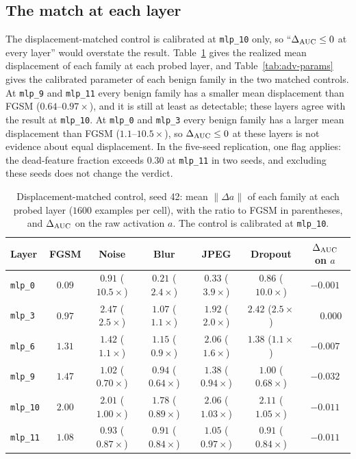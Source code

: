 \documentclass[../ppgc-tese.tex]{subfiles}
\begin{document}
\subsection{The match at each layer}
\label{sec:adv-dx-layers}
The displacement-matched control is calibrated at \texttt{mlp\_10} only, so
``$\Delta_{\mathrm{AUC}}\le0$ at every layer'' would overstate the result.
Table~\ref{tab:adv-dx-layers} gives the realized mean displacement of each
family at each probed layer, and Table~\ref{tab:adv-params} gives the
calibrated parameter of each benign family in the two matched controls. At
\texttt{mlp\_9} and \texttt{mlp\_11} every benign family has a smaller mean
displacement than FGSM ($0.64$--$0.97\times$), and it is still at least as
detectable; these layers agree with the result at \texttt{mlp\_10}. At
\texttt{mlp\_0} and \texttt{mlp\_3} every benign family has a larger mean
displacement than FGSM ($1.1$--$10.5\times$), so $\Delta_{\mathrm{AUC}}\le0$ at these layers
is not evidence about equal displacement. In the five-seed replication, one
flag applies: the dead-feature fraction exceeds $0.30$ at \texttt{mlp\_11} in
two seeds, and excluding these seeds does not change the verdict.

\begin{table}[ht]
  \centering
  \caption{Displacement-matched control, seed 42: mean $\lVert\Delta a\rVert$
  of each family at each probed layer ($1600$ examples per cell), with the
  ratio to FGSM in parentheses, and $\Delta_{\mathrm{AUC}}$ on the raw activation $a$. The
  control is calibrated at \texttt{mlp\_10}.}
  \label{tab:adv-dx-layers}
  \footnotesize
  \setlength{\tabcolsep}{3pt}
  \begin{tabular}{@{}lcccccc@{}}
    \toprule
    Layer & FGSM & Noise & Blur & JPEG & Dropout & $\Delta_{\mathrm{AUC}}$ on $a$ \\
    \midrule
    \texttt{mlp\_0} & $0.09$ & $0.91$ ($10.5\times$) & $0.21$ ($2.4\times$) & $0.33$ ($3.9\times$) & $0.86$ ($10.0\times$) & $-0.001$ \\
    \texttt{mlp\_3} & $0.97$ & $2.47$ ($2.5\times$) & $1.07$ ($1.1\times$) & $1.92$ ($2.0\times$) & $2.42$ ($2.5\times$) & $\phantom{-}0.000$ \\
    \texttt{mlp\_6} & $1.31$ & $1.42$ ($1.1\times$) & $1.15$ ($0.9\times$) & $2.06$ ($1.6\times$) & $1.38$ ($1.1\times$) & $-0.007$ \\
    \texttt{mlp\_9} & $1.47$ & $1.02$ ($0.70\times$) & $0.94$ ($0.64\times$) & $1.38$ ($0.94\times$) & $1.00$ ($0.68\times$) & $-0.032$ \\
    \texttt{mlp\_10} & $2.00$ & $2.01$ ($1.00\times$) & $1.78$ ($0.89\times$) & $2.06$ ($1.03\times$) & $2.11$ ($1.05\times$) & $-0.011$ \\
    \texttt{mlp\_11} & $1.08$ & $0.93$ ($0.87\times$) & $0.91$ ($0.84\times$) & $1.05$ ($0.97\times$) & $0.91$ ($0.84\times$) & $-0.011$ \\
    \bottomrule
  \end{tabular}
\end{table}
\end{document}
